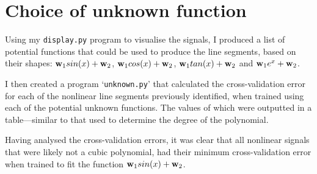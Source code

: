 \documentclass[onecolumn, 12pt, a4paper]{article}
\begin{document}
\section{Choice of unknown function}

Using my \texttt{display.py} program to visualise the
signals, I produced a list of potential functions that could
be used to produce the line segments, based on their shapes:
$\vb{w}_{1}sin(x) + \vb{w}_{2}$,
$\vb{w}_{1}cos(x) + \vb{w}_{2}$,
$\vb{w}_{1}tan(x) + \vb{w}_{2}$ and
$\vb{w}_{1}e^{x} + \vb{w}_{2}$.

I then created a program `\texttt{unknown.py}' that
calculated the cross-validation error for each of the
nonlinear line segments previously identified, when
trained using each of the potential unknown functions.
The values of which were outputted in a table---similar 
to that used to determine the degree of the polynomial.

Having analysed the cross-validation errors, it was clear
that all nonlinear signals that were likely not
a cubic polynomial, had their minimum cross-validation
error when trained to fit the function
$\vb{w}_{1}sin(x) + \vb{w}_{2}$.
\end{document}
